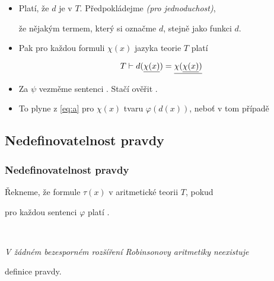     
    \begin{itemize}
    \item Platí, že $d$ je  v $T$. Předpokládejme \emph{(pro jednoduchost)},
    \smallskip
    
    že nějakým termem, který si označme $d$, stejně jako funkci $d$.
    \smallskip
    
    \item Pak pro každou formuli $\chi(x)$ jazyka teorie $T$ platí
    
    \begin{equation}\label{eq:a}{T\vdash d(\underline{\chi(x)})=\underline{\chi(\underline{\chi(x)})}}\end{equation}
    
    
    \item Za $\psi$ vezměme sentenci . Stačí ověřit .
    \smallskip
    
    \item To plyne z \eqref{eq:a} pro $\chi(x)$ tvaru $\varphi(d(x))$, neboť v tom případě
    
    
    
    \end{itemize}
    
    
    \subsection*{Nedefinovatelnost pravdy}
    \subsubsection*{Nedefinovatelnost pravdy}
    
    Řekneme, že formule $\tau(x)$  v aritmetické teorii $T$, pokud
    \smallskip
    
    pro každou sentenci $\varphi$ platí .
    \medskip
    
    \smallskip
    
    {\bf {}}\ \ {\it V žádném bezesporném rozšíření Robinsonovy aritmetiky neexistuje
    \smallskip
    
    definice pravdy.}
    \medskip
    
